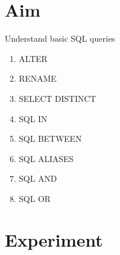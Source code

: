 \documentclass[13pt,oneside]{book}
\begin{document}
		\section*{Aim}
		\large{Understand basic SQL queries
		\begin{enumerate}
			\item ALTER
			\item RENAME
			\item SELECT DISTINCT
			\item SQL IN
			\item SQL BETWEEN
			\item SQL ALIASES
			\item SQL AND
			\item SQL OR
		\end{enumerate}
		}
		\section*{Experiment}
\end{document}

